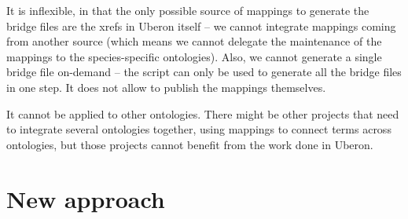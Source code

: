 \begin{frame}
{  It is inflexible, in that the only possible source of mappings to generate
  the bridge files are the xrefs in Uberon itself -- we cannot integrate
  mappings coming from another source (which means we cannot delegate the
  maintenance of the mappings to the species-specific ontologies). Also, we
  cannot generate a single bridge file on-demand -- the script can only be
  used to generate all the bridge files in one step. It does not allow to
  publish the mappings themselves.

  It cannot be applied to other ontologies. There might be other projects that
  need to integrate several ontologies together, using mappings to connect
  terms across ontologies, but those projects cannot benefit from the work
  done in Uberon.}

\end{frame}

\section{New approach}


